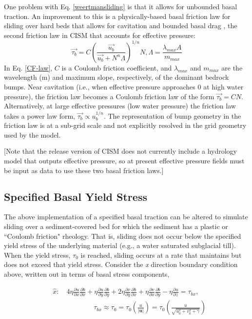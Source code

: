 One problem with Eq. \ref{weertmansliding} is that it allows for unbounded basal traction.
An improvement to this is a physically-based basal friction law for sliding over 
hard beds that allows for cavitation and bounded basal drag \citep[]{Schoof2005}, 
the second friction law in CISM that accounts for effective pressure: 
\begin{equation}
    \label{CF-law}
	  \vec{\tau_b} = C \left( \frac{ \vec{u_b} } { \vec{u_b} + N^n \Lambda} \right)^{1/n} N,   \Lambda=\frac{\lambda_{max}A}{m_{max}}
\end{equation}
In Eq. \ref{CF-law}, $C$ is a Coulomb friction coefficient,  and $\lambda_{max}$ and 
$m_{max}$ are the wavelength (m) and maximum slope, respectively, of the 
dominant bedrock bumps.  Near cavitation (i.e., when effective pressure approaches 
0 at high water pressure), the friction law becomes a Coulomb friction law of the 
form $\vec{\tau_b}=CN$. Alternatively, at large effective pressures (low water pressure) 
the friction law takes a power law form, $\vec{\tau_b} \propto u_b^{1/n}$. 
The representation of bump geometry in the friction law is at a sub-grid scale 
and not explicitly resolved in the grid geometry used by the model.

[Note that the release version of CISM does not currently include a hydrology model
that outputs effective pressure, so at present effective pressure fields must be
input as data to use these two basal friction laws.]

\subsection{Specified Basal Yield Stress}
The above implementation of a specified basal traction can be altered to simulate sliding over a sediment-covered bed for which the sediment has a plastic or ``Coulomb friction" rheology. That is, sliding does not occur below the specified yield stress of the underlying material (e.g., a water saturated subglacial till). When the yield stress, $\tau_0$ is reached, sliding occurs at a rate that maintains but does not exceed that yield stress. Consider the \textit{x} direction boundary condition above, written out in terms of basal stress components,

\begin{equation}
\begin{split}
  & \hat{x}:\quad 4\eta \frac{\partial u}{\partial x}\frac{\partial b}{\partial x}+\eta \frac{\partial u}{\partial y}\frac{\partial b}{\partial y}+2\eta \frac{\partial v}{\partial y}\frac{\partial b}{\partial x}+\eta \frac{\partial v}{\partial x}\frac{\partial b}{\partial y}-\eta \frac{\partial u}{\partial z}=\tau _{bx}, \\ 
 & \quad \quad \quad \quad \quad \quad \tau _{bx}\approx \tau _{0}=\tau _{0}\left( \frac{u}{\left| \mathbf{u} \right|} \right)=\tau _{0}\left( \frac{u}{\sqrt{u_{0}^{2}+v_{0}^{2}+\gamma }} \right) \\ 
\end{split}
\end{equation}


